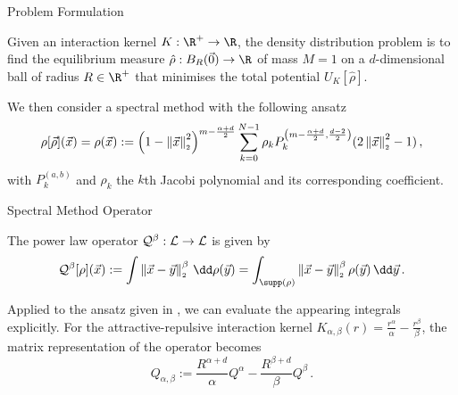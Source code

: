 \documentclass[aspectratio=169, hyperref={colorlinks=true}]{beamer}
\begin{document}
  \begin{frame}{Problem Formulation}
    \begin{definition}
      Given an interaction kernel $K: \R^+ \to \R$, the density distribution problem is to find the equilibrium measure $\hat{\rho}: B_R(\vec{0}) \to \R$ of mass $M = 1$ on a $d$-dimensional ball of radius $R \in \R^+$ that minimises the total potential $U_K[\hat{\rho}]$.
    \end{definition}
    \pause

    We then consider a \alert{spectral method} with the following ansatz
    \begin{equation}
      \rho[\vec{\rho}](\vec{x}) = \rho(\vec{x}) := \left(1-\left\lVert\vec{x}\right\rVert_{\scriptscriptstyle 2}^{2}\right)^{m - \frac{\alpha + d}{2}} \sum_{k=0}^{N-1} \rho_k P_{k}^{\left(m - \frac{\alpha + d}{2},\frac{d-2}{2}\right)}(2 \left\lVert\vec{x}\right\rVert_{\scriptscriptstyle 2}^{2}-1)\,,
      \label{eq:ansatz}
    \end{equation}
    with $P_k^{(a, b)}$ and $\rho_k$ the $k$th Jacobi polynomial and its corresponding coefficient.
  \end{frame}

  \begin{frame}{Spectral Method Operator}
    \begin{definition}
      The power law operator $\mathcal{Q}^\beta: \mathcal{L} \to \mathcal{L}$ is given by
      $$\mathcal{Q}^\beta[\rho](\vec{x}) := \int \norm{\vec{x}-\vec{y}}^\beta \,\dd\rho(\vec{y}) = \int_{\supp(\rho)} \norm{\vec{x}-\vec{y}}^\beta \rho(\vec{y}) \,\dd\vec{y}\,.$$
    \end{definition}

    Applied to the ansatz given in , we can evaluate the appearing integrals \alert{explicitly}.
    For the attractive-repulsive interaction kernel $K_{\alpha,\beta}(r) = \frac{r^\alpha}{\alpha} - \frac{r^\beta}{\beta}$, the matrix representation of the operator becomes
    \begin{equation}
      Q_{\alpha, \beta} := \frac{R^{\alpha+d}}{\alpha} Q^\alpha - \frac{R^{\beta+d}}{\beta} Q^\beta\,.
      \label{eq:full-attrep-operator}
    \end{equation}
  \end{frame}
\end{document}
